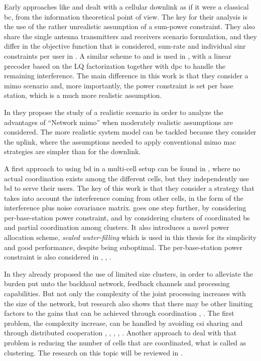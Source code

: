 Early approaches like \cite{shamai01} and \cite{schubert02} dealt with a
cellular downlink as if it were a classical \gls{bc}, from the information
theoretical point of view. The key for their analysis is the use of the rather
unrealistic assumption of a sum-power constraint. They also share the single
antenna transmitters and receivers scenario formulation, and they differ in the
objective function that is considered, sum-rate \cite{shamai01} and individual
\gls{sinr} constraints per user in \cite{schubert02}. A similar scheme to
\cite{shamai01} and \cite{schubert02} is used in \cite{karakayali06b}, with a
linear precoder based on the LQ factorization together with \gls{dpc} to handle
the remaining interference. The main difference in this work is that they
consider a \gls{mimo} scenario and, more importantly, the power constraint is
set per base station, which is a much more realistic assumption.

In \cite{venkatesan07} they propose the study of a realistic scenario in order
to analyze the advantages of ``Network \gls{mimo}'' when moderately realistic
assumptions are considered. The more realistic system model can be tackled
because they consider the uplink, where the assumptions needed to apply
conventional \gls{mimo} \gls{mac} strategies are simpler than for the downlink.

A first approach to using \gls{bd} in a multi-cell setup can be found in
\cite{shim08}, where no actual coordination exists among the different cells,
but they independently use \gls{bd} to serve their users. The key of this work
is that they consider a strategy that takes into account the interference coming
from other cells, in the form of the interference plus noise covariance matrix.
\cite{zhang09} goes one step further, by considering per-base-station power
constraint, and by considering clusters of coordinated \gls{bs} and partial
coordination among clusters. It also introduces a novel power allocation scheme,
\emph{scaled water-filling} which is used in this thesis for its simplicity and
good performance, despite being suboptimal. The per-base-station power
constraint is also considered in \cite{zhang10b}, \cite{liu09},
\cite{boccardi06}.

In \cite{shim08} they already proposed the use of limited size clusters, in
order to alleviate the burden put unto the backhaul network, feedback channels
and processing capabilities. But not only the complexity of the joint processing
increases with the size of the network, but research also shows that there may
be other limiting factors to the gains that can be achieved through coordination
\cite{lozano13}, \cite{barbieri12}. The first problem, the complexity increase,
can be handled by avoiding \gls{csi} sharing and through distributed cooperation
\cite{sun11}, \cite{bjornson10}, \cite{huang11}, \cite{bogale12}, \cite{he14}.
Another approach to deal with that problem is reducing the number of cells that
are coordinated, what is called as clustering. The research on this topic will
be reviewed in .

